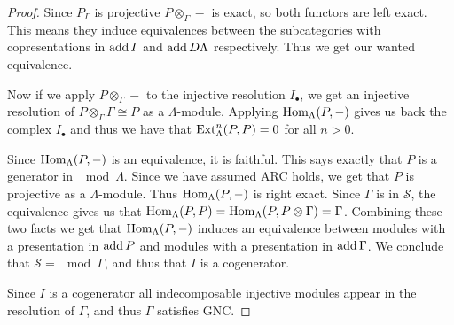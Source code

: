\begin{theorem}
\begin{proof}
		Since $P_\Gamma$ is projective $P\otimes_\Gamma -$ is exact, so both functors are left exact. This means they induce equivalences between the subcategories with copresentations in $\operatorname{add} I$ and $\operatorname{add} D\Lambda$ respectively. Thus we get our wanted equivalence.
		
		Now if we apply $P\otimes_\Gamma -$ to the injective resolution $I_\bullet$, we get an injective resolution of $P\otimes_\Gamma\Gamma \cong P$ as a $\Lambda$-module. Applying $\operatorname{Hom}_\Lambda(P, -)$ gives us back the complex $I_\bullet$ and thus we have that $\operatorname{Ext}_\Lambda^n(P, P)=0$ for all $n>0$. 
		
		Since $\operatorname{Hom}_\Lambda(P, -)$ is an equivalence, it is faithful. This says exactly that $P$ is a generator in $\mod\Lambda$. Since we have assumed ARC holds, we get that $P$ is projective as a $\Lambda$-module. Thus $\operatorname{Hom}_\Lambda(P, -)$ is right exact. Since $\Gamma$ is in $\mathcal S$, the equivalence gives us that $\operatorname{Hom}_\Lambda(P, P) = \operatorname{Hom}_\Lambda(P, P\otimes \Gamma) = \Gamma$. Combining these two facts we get that $\operatorname{Hom}_\Lambda(P,-)$ induces an equivalence between modules with a presentation in $\operatorname{add} P$ and modules with a presentation in $\operatorname{add} \Gamma$. We conclude that $\mathcal S = \mod\Gamma$, and thus that $I$ is a cogenerator.
		
		Since $I$ is a cogenerator all indecomposable injective modules appear in the resolution of $\Gamma$, and thus $\Gamma$ satisfies GNC.
	\end{proof}
\end{theorem}
%
%		
